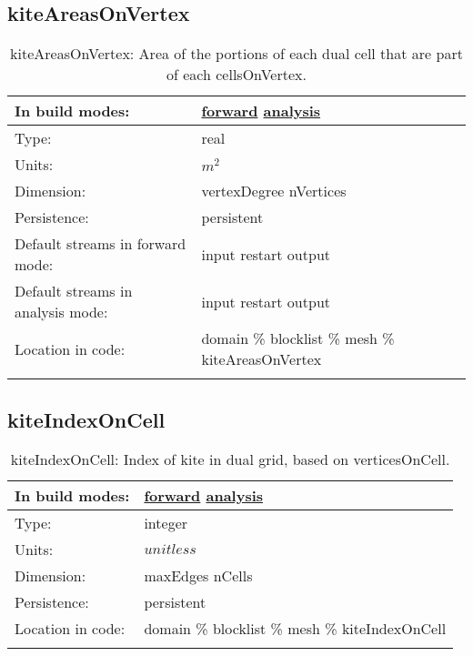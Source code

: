 \subsection[kiteAreasOnVertex]{kiteAreasOnVertex}
\label{subsec:var_sec_mesh_kiteAreasOnVertex}
\begin{center}
\begin{longtable}{| p{2.0in} | p{4.0in} |}
        \hline 
        In build modes: & \hyperref[subsec:forward_var_tab_mesh]{forward} \hyperref[subsec:analysis_var_tab_mesh]{analysis} \\
        \hline 
        Type: & real \\
        \hline 
        Units: & $m^2$ \\
        \hline 
        Dimension: & vertexDegree nVertices \\
        \hline 
        Persistence: & persistent \\
        \hline 
		 Default streams in forward mode: &  input restart output \\
        \hline 
		 Default streams in analysis mode: &  input restart output \\
        \hline 
		 Location in code: & domain \% blocklist \% mesh \% kiteAreasOnVertex \\
		 \hline 
    \caption{kiteAreasOnVertex: Area of the portions of each dual cell that are part of each cellsOnVertex.}
\end{longtable}
\end{center}
\subsection[kiteIndexOnCell]{kiteIndexOnCell}
\label{subsec:var_sec_mesh_kiteIndexOnCell}
\begin{center}
\begin{longtable}{| p{2.0in} | p{4.0in} |}
        \hline 
        In build modes: & \hyperref[subsec:forward_var_tab_mesh]{forward} \hyperref[subsec:analysis_var_tab_mesh]{analysis} \\
        \hline 
        Type: & integer \\
        \hline 
        Units: & $unitless$ \\
        \hline 
        Dimension: & maxEdges nCells \\
        \hline 
        Persistence: & persistent \\
        \hline 
		 Location in code: & domain \% blocklist \% mesh \% kiteIndexOnCell \\
		 \hline 
    \caption{kiteIndexOnCell: Index of kite in dual grid, based on verticesOnCell.}
\end{longtable}
\end{center}
